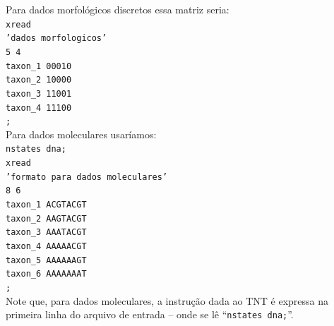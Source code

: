 \begin{refsection}
Para dados morfológicos discretos essa matriz seria:
\\
\indent\indent\texttt{xread}\\
\indent\indent\texttt{'dados morfologicos'}\\
\indent\indent\texttt{5  4}\\
\indent\indent\texttt{taxon\_1   00010}\\
\indent\indent\texttt{taxon\_2   10000}\\
\indent\indent\texttt{taxon\_3   11001}\\
\indent\indent\texttt{taxon\_4   11100}\\
\indent\indent\texttt{;}\\

Para dados moleculares usaríamos:
\\
\indent\indent\texttt{nstates dna;}\\
\indent\indent\texttt{xread}\\
\indent\indent\texttt{'formato para dados moleculares'}\\
\indent\indent\texttt{8 6}\\
\indent\indent\texttt{taxon\_1 ACGTACGT}\\
\indent\indent\texttt{taxon\_2 AAGTACGT}\\
\indent\indent\texttt{taxon\_3 AAATACGT}\\
\indent\indent\texttt{taxon\_4 AAAAACGT}\\
\indent\indent\texttt{taxon\_5 AAAAAAGT}\\
\indent\indent\texttt{taxon\_6 AAAAAAAT}\\
\indent\indent\texttt{;}\\

Note que, para dados moleculares, a instrução dada ao TNT é expressa na primeira linha do arquivo de entrada -- onde se lê ``\texttt{nstates dna;}''.\\


\end{refsection}
